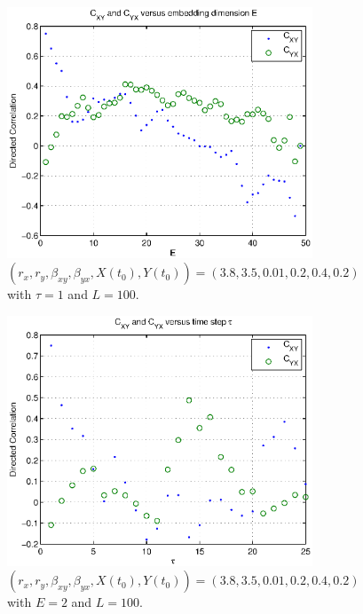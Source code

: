 \documentclass[a4paper,11pt]{article}
\begin{document}
\begin{figure}[h!t]
\centering
\begin{subfigure}[b]{0.4\textwidth}
\label{fig:CxyCyxVE}
\includegraphics[scale=0.55]{graphics/CxyCyxVE.eps}
\caption{$\left(r_x,r_y,\beta_{xy},\beta_{yx},X(t_0),Y(t_0)\right) = \left(3.8,3.5,0.01,0.2,0.4,0.2\right)$ with $\tau=1$ and $L=100$.}
\end{subfigure}
\begin{subfigure}[b]{0.4\textwidth}
\label{fig:CxyCyxVtau}
\includegraphics[scale=0.55]{graphics/CxyCyxVtau.eps}
\caption{$\left(r_x,r_y,\beta_{xy},\beta_{yx},X(t_0),Y(t_0)\right) = \left(3.8,3.5,0.01,0.2,0.4,0.2\right)$ with $E=2$ and $L=100$.}
\end{subfigure}
\caption{}
\end{figure}
\end{document}
